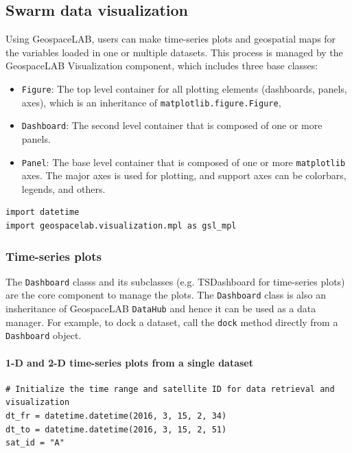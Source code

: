 \subsection{Swarm data visualization}

Using GeospaceLAB, users can make time-series plots and geospatial maps for the variables loaded in one or multiple datasets. This process is managed by the GeospaceLAB Visualization component, which includes three base classes:

\begin{itemize}
\item \texttt{Figure}: The top level container for all plotting elements (dashboards, panels, axes),  which is an inheritance of \texttt{matplotlib.figure.Figure},
\item \texttt{Dashboard}: The second level container that is composed of one or more panels.
\item \texttt{Panel}: The base level container that is composed of one or more \texttt{matplotlib} axes. The major axes is used for plotting, and support axes can be colorbars, legends, and others.
\end{itemize}

\begin{verbatim}
import datetime
import geospacelab.visualization.mpl as gsl_mpl
\end{verbatim}

\subsubsection{Time-series plots}

The \texttt{Dashboard} classs and its subclasses (e.g. TSDashboard for time-series plots) are the core component to manage the plots. The \texttt{Dashboard} class is also an insheritance of GeospaceLAB \texttt{DataHub} and hence it can be used as a data manager. For example, to dock a dataset, call the \texttt{dock} method directly from a \texttt{Dashboard} object.

\paragraph{1-D and 2-D time-series plots from a single dataset}

\begin{verbatim}
# Initialize the time range and satellite ID for data retrieval and visualization
dt_fr = datetime.datetime(2016, 3, 15, 2, 34)
dt_to = datetime.datetime(2016, 3, 15, 2, 51)
sat_id = "A"
\end{verbatim}

